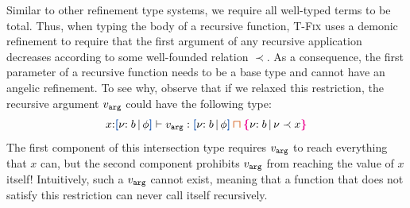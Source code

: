 Similar to other refinement type systems, we require all well-typed
terms to be total. 
Thus, when typing the body of a recursive function, \textsc{T-Fix}
uses a demonic refinement to require that the first argument of any
recursive application decreases according to some well-founded
relation $\prec$. As a consequence, the first parameter of a recursive
function needs to be a base type and cannot have an angelic
refinement.  To see why, observe that if we relaxed this restriction,
the recursive argument $v_{{\tt arg}}$ could have the following
type: %
\vspace{-0.2em}
\begin{align*}
  x{:}\urt{b}{\phi} \vdash v_{\Code{arg}} : \urt{b}{\phi} \interty
  \ort{b}{\vnu \prec x}
\end{align*}%
\noindent The first component of this intersection type requires
$v_{{\tt arg}}$ to reach everything that $x$ can, but the second
component prohibits $v_{{\tt arg}}$ from reaching the value of $x$
itself! Intuitively, such a $v_{{\tt arg}}$ cannot exist, meaning
that a function that does not satisfy this restriction can never call
itself recursively.


